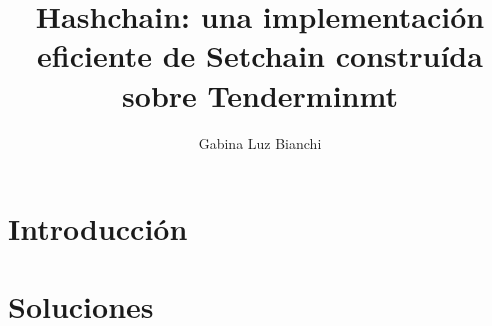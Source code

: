\documentclass[12pt, oneside]{book}
\title{Hashchain: una implementación eficiente de Setchain construída sobre Tenderminmt}
\author{Gabina Luz Bianchi}
\begin{document}
\maketitle



\tableofcontents{}

\chapter{Introducción}





\chapter{Soluciones}







% 


% 


% 


% 


% 



% 
\end{document}

